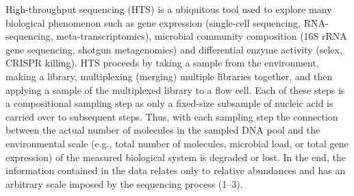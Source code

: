 \documentclass[
]{article}
\begin{document}
High-throughput sequencing (HTS) is a ubiquitous tool used to explore
many biological phenomenon such as gene expression (single-cell
sequencing, RNA-sequencing, meta-transcriptomics), microbial community
composition (16S rRNA gene sequencing, shotgun metagenomics) and
differential enzyme activity (selex, CRISPR killing). HTS proceeds by
taking a sample from the environment, making a library, multiplexing
(merging) multiple libraries together, and then applying a sample of the
multiplexed library to a flow cell. Each of these steps is a
compositional sampling step as only a fixed-size subsample of nucleic
acid is carried over to subsequent steps. Thus, with each sampling step
the connection between the actual number of molecules in the sampled DNA
pool and the environmental scale (e.g., total number of molecules,
microbial load, or total gene expression) of the measured biological
system is degraded or lost. In the end, the information contained in the
data relates only to relative abundances and has an arbitrary scale
imposed by the sequencing process (1--3).
\end{document}
